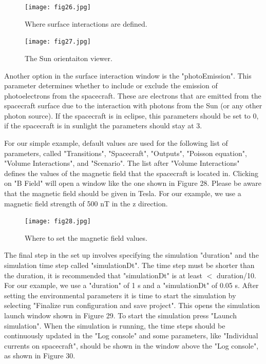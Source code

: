 \documentclass[a4paper, 11pt]{article}
\begin{document}
\begin{figure}[!ht]
    \centering
    \texttt{[image: fig26.jpg]}
    \caption{Where surface interactions are defined.}
\end{figure}

\begin{figure}[!ht]
    \centering
    \texttt{[image: fig27.jpg]}
    \caption{The Sun orientaiton viewer.}
\end{figure}

Another option in the surface interaction window is the "photoEmission". This  parameter determines whether to include or exclude the emission of photoelectrons from the spacecraft. These are electrons that are emitted from the spacecraft surface due to the interaction with photons from the Sun (or any other photon source). If the spacecraft is in eclipse, this parameters should be set to 0, if the spacecraft is in sunlight the parameters should stay at 3.\par
For our simple example, default values are used for the following list of parameters, called "Transitions", "Spacecraft", "Outputs", "Poisson equation", "Volume Interactions", and "Scenario". The list after "Volume Interactions" defines the values of the magnetic field that the spacecraft is located in. Clicking on "B Field" will open a window like the one shown in Figure 28. %
Please be aware that the magnetic field should be given in Tesla. For our example, we use a magnetic field strength of 500 nT in the z direction.

\begin{figure}[!ht]
    \centering
    \texttt{[image: fig28.jpg]}
    \caption{Where to set the magnetic field values.}
\end{figure}

The final step in the set up involves specifying the simulation "duration" and the simulation time step called "simulationDt". The time step must be shorter than the duration, it is recommended that "simulationDt" is at least $<$ duration/10. For our example, we use a "duration" of 1 s and a "simulationDt" of 0.05 s. %
After setting the environmental parameters it is time to start the simulation by selecting "Finalize run configuration and save project". This opens the simulation  launch window shown in Figure 29. To start the simulation press "Launch simulation". When the simulation is running, the time steps should be continuously updated in the "Log console" and some parameters, like "Individual currents on spacecraft", should be shown in the window above the "Log console", as shown in Figure 30.
\end{document}
